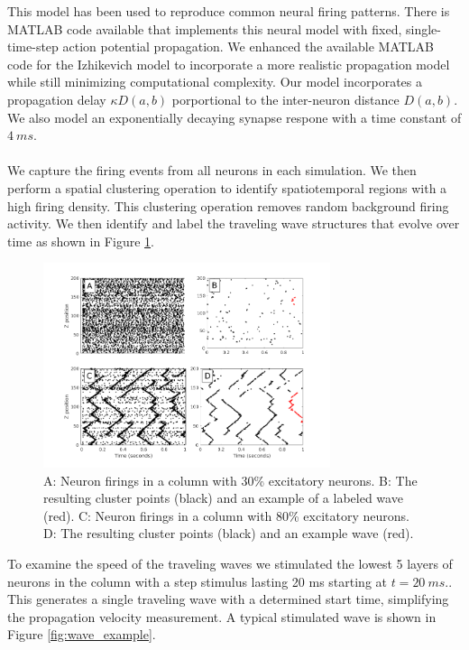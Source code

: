 \documentclass[a4paper,11pt]{article}
\begin{document}
This model has been used to reproduce common neural firing patterns.
There is MATLAB code available \cite{izzy_code} that implements this neural model with fixed, single-time-step action potential propagation.
We enhanced the available MATLAB code for the Izhikevich model to incorporate a more realistic propagation model while still minimizing computational complexity.
Our model incorporates a propagation delay $\kappa D(a,b)$ porportional to the inter-neuron distance $D(a,b)$. 
We also model an exponentially decaying synapse respone with a time constant of $4~ms$.
\\ \\
We capture the firing events from all neurons in each simulation.
We then perform a spatial clustering operation to identify spatiotemporal regions with a high firing density.
This clustering operation removes random background firing activity.
We then identify and label the traveling wave structures that evolve over time as shown in Figure \ref{fig:wave_analysis}.
\begin{figure}[!htb]
 \caption{A: Neuron firings in a column with 30\% excitatory neurons. B: The resulting cluster points (black) and an example of a labeled wave (red).
          C: Neuron firings in a column with 80\% excitatory neurons. D: The resulting cluster points (black) and an example wave (red).}
 \label{fig:wave_analysis}
 \centering
   \includegraphics[width=0.75\textwidth]{fig/WaveAnalysisExample}
\end{figure}
To examine the speed of the traveling waves we stimulated the lowest 5 layers of neurons in the column with a step stimulus lasting 20 ms starting at $t=20~ms$..
This generates a single traveling wave with a determined start time, simplifying the propagation velocity measurement.
A typical stimulated wave is shown in Figure \ref{fig:wave_example}.
\end{document}
